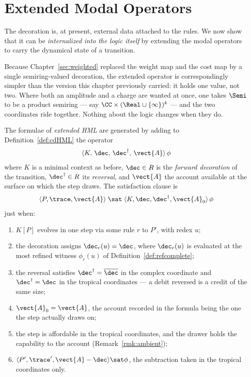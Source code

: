 \chapter{Extended Modal Operators}
\label{sec:extended-modal}

The decoration is, at present, external data attached to the rules.  We
now show that it can be \emph{internalized into the logic itself} by
extending the modal operators to carry the dynamical state of a
transition.

Because Chapter~\ref{sec:weighted} replaced the weight map and the cost
map by a single semiring-valued decoration, the extended operator is
correspondingly simpler than the version this chapter previously carried:
it holds one value, not two.  Where both an amplitude and a charge are
wanted at once, one takes $\Semi$ to be a product semiring --- say
$\CC \times (\Real\cup\{\infty\})^k$ --- and the two coordinates ride
together.  Nothing about the logic changes when they do.

\begin{definition}
\label{def:ext-modal}
The formulae of \emph{extended HML} are generated by adding to
Definition~\ref{def:cdHML} the operator
\[
  \langle K,\, \dec,\, \dec^{\dagger},\, \vect{A} \rangle\,\phi
\]
where $K$ is a minimal context as before, $\dec \in R$ is the
\emph{forward decoration} of the transition, $\dec^{\dagger} \in R$ its
\emph{reversal}, and $\vect{A}$ the account available at the surface on
which the step draws.  The satisfaction clause is
\[
  \langle P, \trace, \vect{A} \rangle \;\sat\;
  \langle K, \dec, \dec^{\dagger}, \vect{A}_0 \rangle\,\phi
\]
just when:
\begin{enumerate}[label=(\roman*)]
  \item $K[P]$ evolves in one step via some rule $r$ to $P'$, with redex
        $u$;
  \item the decoration assigns $\dec_r(u) = \dec$, where $\dec_r(u)$ is
        evaluated at the most refined witness $\phi_r(u)$ of
        Definition~\ref{def:refcomplete};
  \item the reversal satisfies $\dec^{\dagger} = \overline{\dec}$ in the
        complex coordinate and $\dec^{\dagger} = \dec$ in the tropical
        coordinates --- a debit reversed is a credit of the same size;
  \item $\vect{A}_0 = \vect{A}$, the account recorded in the formula being
        the one the step actually draws on;
  \item the step is affordable in the tropical coordinates, and the drawer
        holds the capability to the account (Remark~\ref{rmk:ambient});
  \item $\langle P', \trace', \vect{A} - \dec \rangle \sat \phi$, the
        subtraction taken in the tropical coordinates only.
\end{enumerate}
\end{definition}

